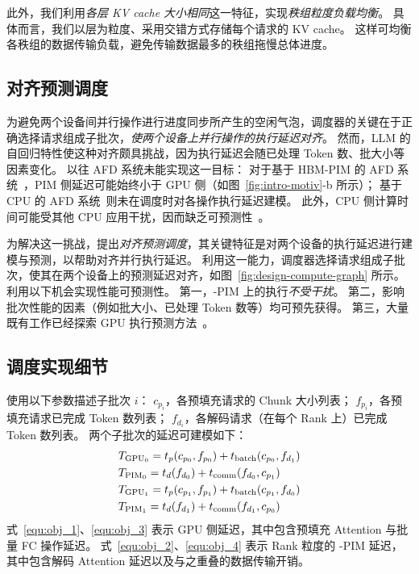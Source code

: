 此外，我们利用\emph{各层 KV cache 大小相同}这一特征，实现\emph{秩组粒度负载均衡}。
具体而言，我们以层为粒度、采用交错方式存储每个请求的 KV cache。
这样可均衡各秩组的数据传输负载，避免传输数据最多的秩组拖慢总体进度。

\subsection{对齐预测调度}
\label{sec:sys-scheduler}
为避免两个设备间并行操作进行进度同步所产生的空闲气泡，\sys 调度器的关键在于正确选择请求组成子批次，\emph{使两个设备上并行操作的执行延迟对齐}。
然而，LLM 的自回归特性使这种对齐颇具挑战，因为执行延迟会随已处理 Token 数、批大小等因素变化。
以往 AFD 系统未能实现这一目标：
对于基于 HBM-PIM 的 AFD 系统~\cite{park2024attacc,heo2024neupims}，PIM 侧延迟可能始终小于 GPU 侧（如图~\ref{fig:intro-motiv}-b 所示）；
基于 CPU 的 AFD 系统~\cite{jiang2024neo}则未在调度时对各操作执行延迟建模。
此外，CPU 侧计算时间可能受其他 CPU 应用干扰，因而缺乏可预测性~\cite{christina2013paragon,liu2024jiagu,lo2015heracles}。

为解决这一挑战，\sys 提出\emph{对齐预测调度}，其关键特征是对两个设备的执行延迟进行建模与预测，以帮助对齐并行执行延迟。
利用这一能力，调度器选择请求组成子批次，使其在两个设备上的预测延迟对齐，如图~\ref{fig:design-compute-graph} 所示。
\sys 利用以下机会实现性能可预测性。
第一，\sys-PIM 上的执行\emph{不受干扰}。
第二，影响批次性能的因素（例如批大小、已处理 Token 数等）均可预先获得。
第三，大量既有工作已经探索 GPU 执行预测方法~\cite{cui2021abacus,gujarati2020clockwork,yang2022infless}。

\subsection{调度实现细节}
\sys 使用以下参数描述子批次 $i$：
$c_{p_i}$，各预填充请求的 Chunk 大小列表；
$f_{p_i}$，各预填充请求已完成 Token 数列表；
$f_{d_i}$，各解码请求（在每个 Rank 上）已完成 Token 数列表。
两个子批次的延迟可建模如下：
\begin{align}
  \label{equ:obj_1} &T_{{\rm GPU}_{0}} = t_p(c_{p_0}, f_{p_0}) + t_{\rm batch}(c_{p_0}, f_{d_1}) \\
  \label{equ:obj_2} &T_{{\rm PIM}_{0}} = t_d(f_{d_0}) + t_{\rm comm}(f_{d_0}, c_{p_1}) \\
  \label{equ:obj_3} &T_{{\rm GPU}_{1}} = t_p(c_{p_1}, f_{p_1}) + t_{\rm batch}(c_{p_1}, f_{d_0}) \\
  \label{equ:obj_4} &T_{{\rm PIM}_{1}} = t_d(f_{d_1}) + t_{\rm comm}(f_{d_1}, c_{p_0})
\end{align}
式~\ref{equ:obj_1}、\ref{equ:obj_3} 表示 GPU 侧延迟，其中包含预填充 Attention 与批量 FC 操作延迟。
式~\ref{equ:obj_2}、\ref{equ:obj_4} 表示 Rank 粒度的 \sys-PIM 延迟，其中包含解码 Attention 延迟以及与之重叠的数据传输开销。


